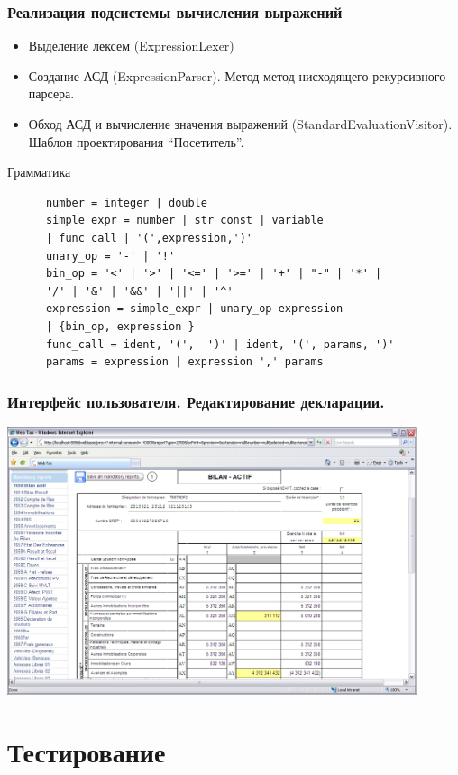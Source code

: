 \documentclass[xcolor=pdftex, dvipsnames, table]{beamer}
\begin{document}
\begin{frame}[fragile]
  \frametitle{Реализация подсистемы вычисления выражений}
  \begin{itemize}
    \item Выделение лексем (ExpressionLexer)
    \item Создание АСД (ExpressionParser). Метод метод нисходящего рекурсивного парсера.
    \item Обход АСД и вычисление значения выражений (StandardEvaluationVisitor). Шаблон проектирования ``Посетитель''.
  \end{itemize}

  \begin{exampleblock}{Грамматика}
    \begin{verbatim}
      number = integer | double
      simple_expr = number | str_const | variable
      | func_call | '(',expression,')'
      unary_op = '-' | '!'
      bin_op = '<' | '>' | '<=' | '>=' | '+' | "-" | '*' |
      '/' | '&' | '&&' | '||' | '^'
      expression = simple_expr | unary_op expression
      | {bin_op, expression }
      func_call = ident, '(',  ')' | ident, '(', params, ')'
      params = expression | expression ',' params
    \end{verbatim}
  \end{exampleblock}
\end{frame}

\begin{frame}
  \frametitle{Интерфейс пользователя. Редактирование декларации.}
  \begin{center}
    \includegraphics[width=0.9\textwidth]{pics/src_reportnice}
  \end{center}
\end{frame}


\section{Тестирование}
\end{document}
